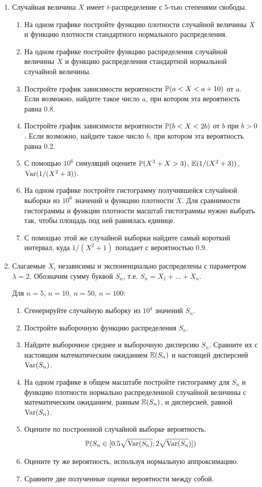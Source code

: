 \documentclass[12pt, a4paper]{article}\usepackage[]{graphicx}\usepackage[]{color}
\begin{document}
\begin{enumerate}
\item Случайная величина $X$ имеет $t$-распределение с $5$-тью степенями свободы.
\begin{enumerate}
\item На одном графике постройте функцию плотности случайной величины $X$ и функцию плотности стандартного нормального распределения.
\item На одном графике постройте функцию распределения случайной величины $X$ и функцию распределения стандартной нормальной случайной величины.
\item Постройте график зависимости вероятности $\P(a<X<a+10)$ от $a$. Если возможно, найдите такое число $a$, при котором эта вероятность равна $0.8$.
\item Постройте график зависимости вероятности $\P(b<X<2b)$ от $b$ при $b>0$. Если возможно, найдите такое число $b$, при котором эта вероятность равна $0.2$.
\item С помощью $10^6$ симуляций оцените $\P(X^3+X>3)$, $\E(1/(X^2+3))$, $\Var(1/(X^2+3))$.
\item На одном графике постройте гистограмму получившейся случайной выборки из $10^6$ значений и функцию плотности $X$. Для сравнимости гистограммы и функции плотности масштаб гистограммы нужно выбрать так, чтобы площадь под ней равнялась единице.
\item С помощью этой же случайной выборки найдите самый короткий интервал, куда $1/(X^2+1)$ попадает с вероятностью $0.9$.
\end{enumerate}


\item Слагаемые $X_i$ независимы и экспоненциально распределены с параметром $\lambda=2$. Обозначим сумму буквой $S_n$, т.е. $S_n=X_1+\ldots+X_n$.

Для $n=5$, $n=10$, $n=50$, $n=100$:

\begin{enumerate}
\item Сгенерируйте случайную выборку из $10^4$ значений $S_n$.
\item Постройте выборочную функцию распределения $S_n$.
\item Найдите выборочное среднее и выборочную дисперсию $S_n$. Сравните их с настоящим математическим ожиданием $\E(S_n)$ и настоящей дисперсией $\Var(S_n)$.
\item На одном графике в общем масштабе постройте гистограмму для $S_n$ и функцию плотности нормально распределенной случайной величины с математическим ожиданием, равным $\E(S_n)$, и дисперсией, равной $\Var(S_n)$.
\item Оцените по построенной случайной выборке вероятность.
\[ \P(S_n \in [0.5 \sqrt{\Var(S_n)} ; 2\sqrt{\Var(S_n}) ]) \]
\item Оцените ту же вероятность, используя нормальную аппроксимацию.
\item Сравните две полученные оценки вероятности между собой.
\end{enumerate}



\end{enumerate}
\end{document}

